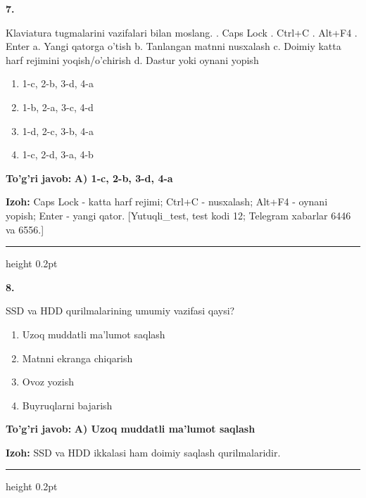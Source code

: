 \documentclass[10pt,a4paper]{article}
\begin{document}
{\bfseries\sffamily\color{ink} 7.}
\par
Klaviatura tugmalarini vazifalari bilan moslang. . Caps Lock . Ctrl+C . Alt+F4 . Enter \newline a. Yangi qatorga o'tish \newline b. Tanlangan matnni nusxalash \newline c. Doimiy katta harf rejimini yoqish/o'chirish \newline d. Dastur yoki oynani yopish
\begin{enumerate}[label=\Alph*),leftmargin=9mm]
\item 1-c, 2-b, 3-d, 4-a
\item 1-b, 2-a, 3-c, 4-d
\item 1-d, 2-c, 3-b, 4-a
\item 1-c, 2-d, 3-a, 4-b
\end{enumerate}
\begin{tcolorbox}[enhanced,breakable,colback=teal!4,colframe=teal!60!black,boxrule=0.45pt,arc=1.2mm,left=2.7mm,right=2.7mm,top=1.8mm,bottom=1.8mm,before skip=2mm,after skip=2mm]
{\bfseries\sffamily\color{teal}To'g'ri javob:} \textbf{A) 1-c, 2-b, 3-d, 4-a}
\par\smallskip
{\bfseries Izoh:} Caps Lock - katta harf rejimi; Ctrl+C - nusxalash; Alt+F4 - oynani yopish; Enter - yangi qator. [Yutuqli\_test, test kodi 12; Telegram xabarlar 6446 va 6556.]
\end{tcolorbox}
\vspace{2mm}\hrule height 0.2pt\vspace{3mm}

{\bfseries\sffamily\color{ink} 8.}
\par
SSD va HDD qurilmalarining umumiy vazifasi qaysi?
\begin{enumerate}[label=\Alph*),leftmargin=9mm]
\item Uzoq muddatli ma'lumot saqlash
\item Matnni ekranga chiqarish
\item Ovoz yozish
\item Buyruqlarni bajarish
\end{enumerate}
\begin{tcolorbox}[enhanced,breakable,colback=teal!4,colframe=teal!60!black,boxrule=0.45pt,arc=1.2mm,left=2.7mm,right=2.7mm,top=1.8mm,bottom=1.8mm,before skip=2mm,after skip=2mm]
{\bfseries\sffamily\color{teal}To'g'ri javob:} \textbf{A) Uzoq muddatli ma'lumot saqlash}
\par\smallskip
{\bfseries Izoh:} SSD va HDD ikkalasi ham doimiy saqlash qurilmalaridir.
\end{tcolorbox}
\vspace{2mm}\hrule height 0.2pt\vspace{3mm}
\end{document}
